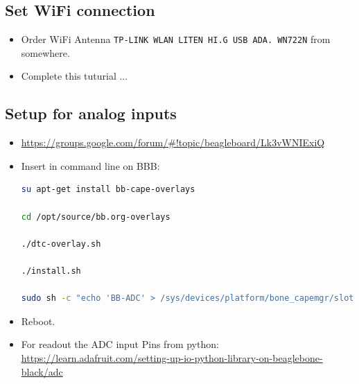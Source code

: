 \documentclass[
	fontsize=10pt
	paper=a4
]{scrartcl}
\begin{document}
\subsection{Set WiFi connection}

\begin{itemize}

\item Order WiFi Antenna \texttt{TP-LINK WLAN LITEN HI.G USB ADA. WN722N} from somewhere.

\item Complete this tuturial ...

\end{itemize}



\subsection{Setup for analog inputs}

\begin{itemize}

\item \url{https://groups.google.com/forum/#!topic/beagleboard/Lk3vWNIExiQ}

\item Insert in command line on BBB:

\begin{lstlisting}[language=bash]
su apt-get install bb-cape-overlays

cd /opt/source/bb.org-overlays

./dtc-overlay.sh

./install.sh

sudo sh -c "echo 'BB-ADC' > /sys/devices/platform/bone_capemgr/slots"
\end{lstlisting}


\item Reboot.

\item For readout the ADC input Pins from python: \url{https://learn.adafruit.com/setting-up-io-python-library-on-beaglebone-black/adc}


\end{itemize}





\end{document}

